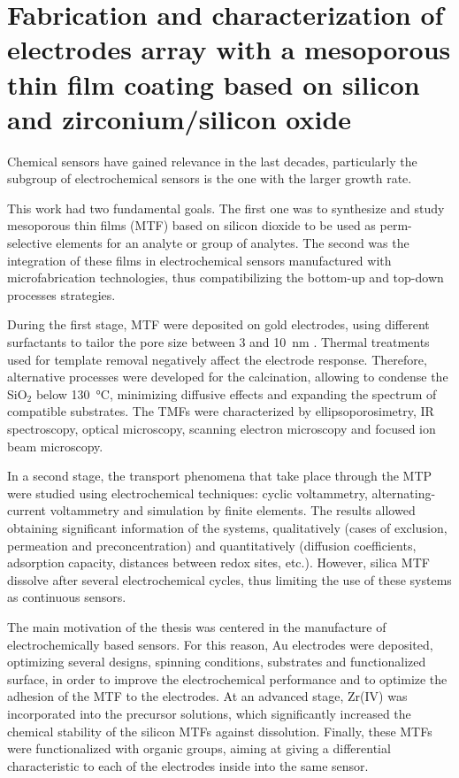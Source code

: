 \mtcaddchapter[Abstract]

\section*{\centering\large{\bfseries{Fabrication and characterization of electrodes array with a mesoporous thin film coating based on silicon and zirconium/silicon oxide}}}

\vspace*{\fill}

Chemical sensors have gained relevance in the last decades, particularly the subgroup of electrochemical sensors is the one with the larger growth rate.

This work had two fundamental goals. The first one was to synthesize and study mesoporous thin films (MTF) based on silicon dioxide to be used as perm-selective elements for an analyte or group of analytes. The second was the integration of these films in electrochemical sensors manufactured with microfabrication technologies, thus compatibilizing the bottom-up and top-down processes strategies.

During the first stage, MTF were deposited on gold electrodes, using different surfactants to tailor the pore size between  3 and \SI{10}{\nm} . Thermal treatments used for template removal negatively affect the electrode response. Therefore, alternative processes were developed for the calcination, allowing to condense the SiO$_2$ below \SI{130}{\celsius}, minimizing diffusive effects and expanding the spectrum of compatible substrates. The TMFs were characterized by ellipsoporosimetry, IR spectroscopy, optical microscopy, scanning electron microscopy and focused ion beam microscopy.

In a second stage, the transport phenomena that take place through the MTP were studied using electrochemical techniques: cyclic voltammetry, alternating-current voltammetry and simulation by finite elements. The results allowed obtaining significant information of the systems, qualitatively (cases of exclusion, permeation and preconcentration) and quantitatively (diffusion coefficients, adsorption capacity, distances between redox sites, etc.). However, silica MTF dissolve after several electrochemical cycles, thus limiting the use of these systems as continuous sensors.

The main motivation of the thesis was centered in the manufacture of electrochemically based sensors. For this reason, Au electrodes were deposited, optimizing several designs, spinning conditions, substrates and functionalized surface, in order to improve the electrochemical performance and to optimize the adhesion of the MTF to the electrodes. At an advanced stage, Zr(IV) was incorporated into the precursor solutions, which significantly increased the chemical stability of the silicon MTFs against dissolution. Finally, these MTFs were functionalized with organic groups, aiming at giving a differential characteristic to each of the electrodes inside into the same sensor.

